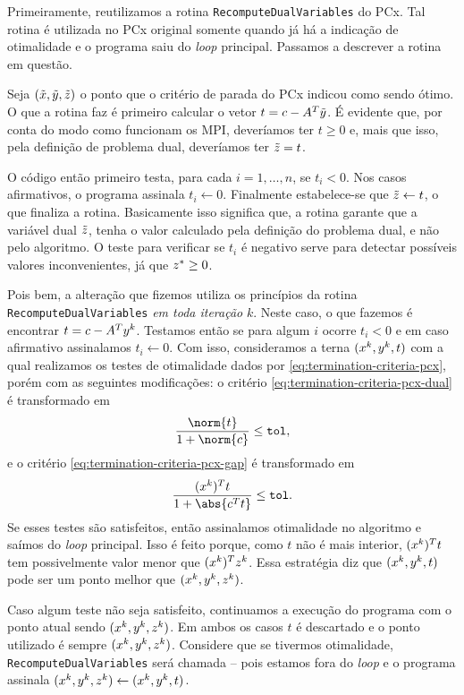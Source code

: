 Primeiramente,  reutilizamos a rotina \verb|RecomputeDualVariables| do PCx. Tal rotina  é utilizada no PCx original somente quando já há a indicação de otimalidade e o programa saiu do \emph{loop} principal. Passamos a descrever  a rotina em questão. 

Seja $(\tilde{x},\tilde{y},\tilde{z})$ o ponto que o critério de parada do PCx indicou como sendo ótimo. O que a rotina faz é primeiro calcular o vetor  $t= c - A^T\tilde{y}$. É evidente que, por conta do modo como funcionam os \ac{MPI}, deveríamos ter $t\geq0$ e, mais que isso, pela definição de problema dual, deveríamos ter $\tilde{z} = t$. 

 O código então primeiro testa, para cada  $i = 1,\ldots,n$, se $t_{i}<0$.  Nos casos afirmativos, o programa assinala $t_{i}\leftarrow 0$. Finalmente estabelece-se que  $\tilde{z} \leftarrow t $, o que finaliza a rotina. Basicamente isso significa que, a rotina garante que a variável dual $\tilde{z}$, tenha o valor calculado pela definição do problema dual, e não pelo algoritmo. O teste para verificar se $t_{i}$ é negativo serve para detectar possíveis valores inconvenientes, já que $z^*\geq 0$.

 Pois bem, a alteração que fizemos utiliza os princípios da rotina   \verb|RecomputeDualVariables| \emph{em toda iteração} $k$. Neste caso, o que fazemos é encontrar $t= c - A^Ty^{k}$. Testamos então se para algum  $i$ ocorre $t_{i}<0$ e em caso afirmativo assinalamos $t_{i}\leftarrow 0$. Com isso, consideramos a terna $(x^{k},y^{k},t)$ com a qual realizamos os testes de otimalidade dados por
 \eqref{eq:termination-criteria-pcx}, porém com as seguintes modificações: o critério \eqref{eq:termination-criteria-pcx-dual} é transformado em
\[\dfrac{\norm{t}}{1 + \norm{c}} \leq \tol,\]	
e o critério  \eqref{eq:termination-criteria-pcx-gap} é transformado em 
\[
	\dfrac{(\xk)^{T}t}{1 + \abs{c^Tt}}\leq\tol.
\]
Se esses testes são satisfeitos, então assinalamos otimalidade no algoritmo e saímos do \emph{loop} principal. 
Isso é feito porque,  como $t$ não é mais interior, $(x^{k})^{T}t$ tem possivelmente valor menor que $(x^{k})^{T}z^{k}$. Essa estratégia diz que $(x^{k},y^{k},t)$ pode ser um ponto melhor que $(x^{k},y^{k},z^{k})$.  

Caso algum teste  não seja satisfeito, continuamos a execução do programa com o ponto atual sendo $(x^{k},y^{k},z^{k})$. Em ambos os casos $t$ é descartado e o ponto utilizado é sempre $(x^{k},y^{k},z^{k})$. Considere que se tivermos otimalidade, \verb|RecomputeDualVariables| será chamada -- pois estamos fora do \emph{loop} e o programa assinala $(x^{k},y^{k},z^{k})\leftarrow (x^{k},y^{k},t)$. 

